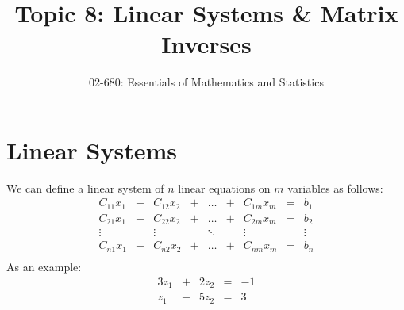 

\title{Topic 8: Linear Systems \& Matrix Inverses}
\author{02-680: Essentials of Mathematics and Statistics}


\maketitle

\section{Linear Systems}
We can define a linear system of $n$ linear equations on $m$ variables as follows: 
\[\begin{array}{ccccccccc}
C_{11} x_1 & + & C_{12} x_2 & + & \hdots & + & C_{1m} x_m & = & b_1\\
C_{21} x_1 & + & C_{22} x_2 & + & \hdots & + & C_{2m} x_m & = & b_2\\
\vdots & & \vdots & & \ddots & & \vdots & & \vdots\\
C_{n1} x_1 & + & C_{n2} x_2 & + & \hdots & + & C_{nm} x_m & = & b_n\\
\end{array}\]
As an example: 
\[\begin{array}{rcrcr}
3 z_1 & + & 2 z_2 & = & -1\\
 z_1 & - & 5 z_2 & = & 3\\
\end{array}\]

